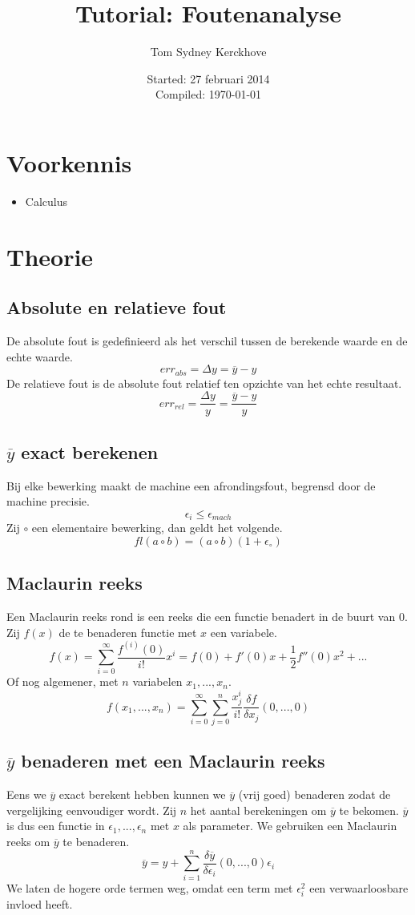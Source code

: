 \documentclass[10pt,a4paper]{article}
\author{Tom Sydney Kerckhove}
\title{Tutorial: Foutenanalyse}
\date{Started: 27 februari 2014\\ Compiled: \today}
\begin{document}
\maketitle
\tableofcontents

\section{Voorkennis}
\begin{itemize}
\item Calculus
\end{itemize}

\pagebreak

\section{Theorie}
\subsection{Absolute en relatieve fout}
De absolute fout is gedefinieerd als het verschil tussen de berekende waarde en de echte waarde.
\[
err_{abs} = \Delta y = \overline{y} - y
\]
De relatieve fout is de absolute fout relatief ten opzichte van het echte resultaat.
\[
err_{rel} = \frac{\Delta y}{y} = \frac{\overline{y} - y}{y}
\]

\subsection{$\overline{y}$ exact berekenen}
Bij elke bewerking maakt de machine een afrondingsfout, begrensd door de machine precisie.
\[
\epsilon_i \le \epsilon_{mach}
\]
Zij $\circ$ een elementaire bewerking, dan geldt het volgende.
\[
fl(a\circ b) = (a\circ b)(1+\epsilon_{\circ})
\]

\subsection{Maclaurin reeks}
Een Maclaurin reeks rond is een reeks die een functie benadert in de buurt van $0$. Zij $f(x)$ de te benaderen functie met $x$ een variabele.
\[
f(x) = \sum_{i=0}^\infty\frac{f^{(i)}(0)}{i!}x^i = f(0) + f'(0)x + \frac{1}{2}f''(0)x^2 + ...
\]
Of nog algemener, met $n$ variabelen $x_1,...,x_n$.
\[
f(x_1,...,x_n) = \sum_{i=0}^\infty\sum_{j=0}^{n}\frac{x_j^i}{i!}\frac{\delta f}{\delta x_j}(0,...,0)
\]

\subsection{$\overline{y}$ benaderen met een Maclaurin reeks}
Eens we $\overline{y}$ exact berekent hebben kunnen we $\overline{y}$ (vrij goed) benaderen zodat de vergelijking eenvoudiger wordt. Zij $n$ het aantal berekeningen om $\overline{y}$ te bekomen. $\overline{y}$ is dus een functie in $\epsilon_1,...,\epsilon_n$ met $x$ als parameter. We gebruiken een Maclaurin reeks om $\overline{y}$ te benaderen.
\[
\overline{y} = y + \sum_{i=1}^{n}\frac{\delta\overline{y}}{\delta\epsilon_i}(0,...,0)\epsilon_i
\]
We laten de hogere orde termen weg, omdat een term met $\epsilon_{i}^2$ een verwaarloosbare invloed heeft. 
\end{document}

